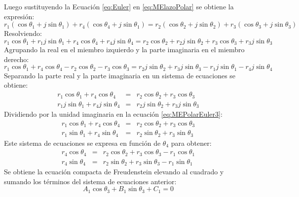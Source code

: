 Luego sustituyendo la Ecuación \ref{eq:Euler} en \ref{eq:MElazoPolar} se obtiene la expresión:
\begin{equation}\label{eq:MEPolarEuler}
r_1(\cos{\theta_1}+j\sin{\theta_1})+r_4(\cos{\theta_4}+j\sin{\theta_1})=r_2(\cos{\theta_2}+j\sin{\theta_2})+r_3(\cos{\theta_3}+j\sin{\theta_3})
\end{equation}
Resolviendo:
\begin{equation}\label{eq:MEPolarEuler2}
r_1 \cos{\theta_1}+r_1 j \sin{\theta_1}+r_4\cos{\theta_4}+r_4j\sin{\theta_4}=r_2\cos{\theta_2}+r_2 j\sin{\theta_2}+r_3\cos{\theta_3}+r_3j\sin{\theta_3}
\end{equation}
Agrupando la real en el miembro izquierdo y la parte imaginaria en el miembro derecho:
\begin{equation}\label{eq:MEPolarEuler21}
r_1 \cos{\theta_1}+r_4\cos{\theta_4}- r_2\cos{\theta_2}-r_3\cos{\theta_3}=r_2 j\sin{\theta_2}+r_3j\sin{\theta_3} -r_1 j \sin{\theta_1}-r_4j\sin{\theta_4}
\end{equation} 
Separando la parte real y la parte imaginaria en un sistema de ecuaciones se obtiene:
\begin{eqnarray}
r_1 \cos{\theta_1}+r_4\cos{\theta_4}&=&r_2\cos{\theta_2} +r_3\cos{\theta_3} \label{eq:MEPolarEuler4} \\
r_1j\sin{\theta_1}+r_4j\sin{\theta_4} &=&r_2j\sin{\theta_2}+r_3j\sin{\theta_3}\label{eq:MEPolarEuler3}
\end{eqnarray}
Dividiendo por la unidad imaginaria en la ecuación \ref{eq:MEPolarEuler3}: 
\begin{eqnarray}
r_1 \cos{\theta_1}+r_4\cos{\theta_4}&=&r_2\cos{\theta_2} +r_3\cos{\theta_3} \label{eq:MEPolarEuler5} \\
r_1\sin{\theta_1}+r_4\sin{\theta_4} &=&r_2\sin{\theta_2}+r_3\sin{\theta_3}\label{eq:MEPolarEuler6}
\end{eqnarray}
Este sistema de ecuaciones se expresa en función de $\theta_4$ para obtener:
\begin{eqnarray}
r_4\cos{\theta_4}&=&r_2\cos{\theta_2} +r_3\cos{\theta_3}-r_1 \cos{\theta_1}\label{eq:MEPolarEuler7} \\
r_4\sin{\theta_4} &=&r_2\sin{\theta_2}+r_3\sin{\theta_3}-r_1\sin{\theta_1}\label{eq:MEPolarEuler8}
\end{eqnarray}
Se obtiene la ecuación compacta de Freudenstein elevando al cuadrado y sumando los términos
del sistema de ecuaciones anterior:
\begin{equation} \label{eq:A1B1C1}
 A_1\cos{\theta_3}+B_1\sin{\theta_3}+C_1=0 
\end{equation}
